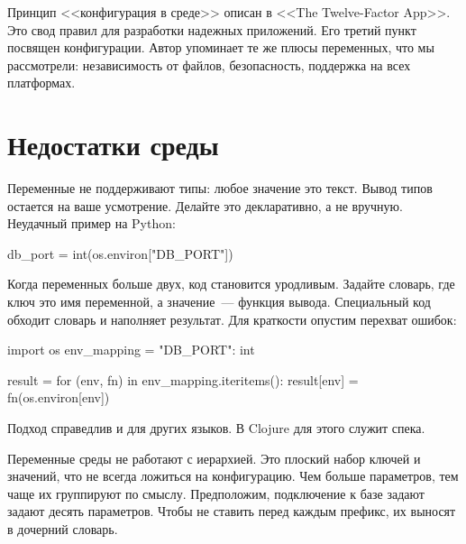
Принцип <<конфигурация в среде>> описан в <<The Twelve-Factor App>>.
Это свод правил для разработки надежных приложений. Его третий пункт посвящен конфигурации.
Автор упоминает те же плюсы переменных, что мы рассмотрели: независимость от файлов,
безопасность, поддержка на всех платформах.

\section{Недостатки среды}


Переменные не поддерживают типы: любое значение это текст. Вывод типов остается
на ваше усмотрение. Делайте это декларативно, а не вручную. Неудачный пример на
Python:


\begin{english}
  \begin{python}
db_port = int(os.environ["DB_PORT"])
  \end{python}
\end{english}

Когда переменных больше двух, код становится уродливым. Задайте словарь, где
ключ это имя переменной, а значение~--- функция вывода. Специальный код обходит
словарь и наполняет результат. Для краткости опустим перехват ошибок:

\begin{english}
  \begin{python}
import os
env_mapping = {"DB_PORT": int}

result = {}
for (env, fn) in env_mapping.iteritems():
    result[env] = fn(os.environ[env])
  \end{python}
\end{english}

\noindent
Подход справедлив и для других языков. В Clojure для этого служит спека.

Переменные среды не работают с иерархией. Это плоский набор ключей и значений,
что не всегда ложиться на конфигурацию. Чем больше параметров, тем чаще их
группируют по смыслу. Предположим, подключение к базе задают задают десять
параметров. Чтобы не ставить перед каждым префикс, их выносят в дочерний
словарь.


